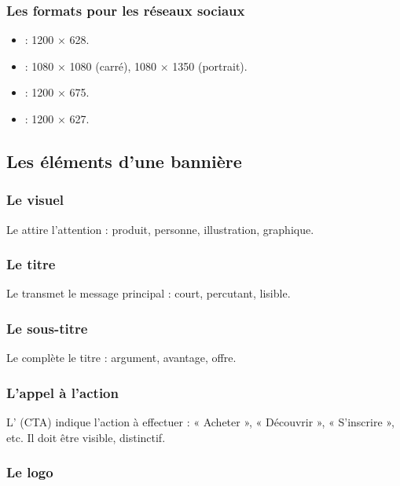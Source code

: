 \subsubsection{Les formats pour les réseaux sociaux}

\begin{itemize}
    \item {} : 1200 × 628.
    \item {} : 1080 × 1080 (carré), 1080 × 1350 (portrait).
    \item {} : 1200 × 675.
    \item {} : 1200 × 627.
\end{itemize}

\subsection{Les éléments d'une bannière}

\subsubsection{Le visuel}

Le  attire l'attention : produit, personne, illustration, graphique.

\subsubsection{Le titre}

Le  transmet le message principal : court, percutant, lisible.

\subsubsection{Le sous-titre}

Le  complète le titre : argument, avantage, offre.

\subsubsection{L'appel à l'action}

L' (CTA) indique l'action à effectuer : « Acheter », « Découvrir », « S'inscrire », etc. Il doit être visible, distinctif.

\subsubsection{Le logo}

